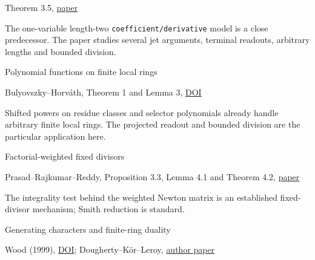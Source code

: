 \documentclass[11pt,a4paper]{article}
\newlength{\OfflineResearchTableWidth}
\newcommand{\OfflineResearchRow}{\par}
\newenvironment{OfflineResearchTable}{%
  \par\medskip\begingroup\small\setlength{\parindent}{0pt}%
  \setlength{\parskip}{3pt plus 1pt minus .5pt}%
  \setlength{\OfflineResearchTableWidth}{\linewidth}%
}{%
  \par\endgroup\medskip%
}
\begin{document}
\begin{OfflineResearchTable}
\begin{minipage}[t]{0.34020\OfflineResearchTableWidth}
Theorem 3.5, \href{https://arxiv.org/abs/1910.00238}{paper}
\end{minipage}\hfill%
\begin{minipage}[t]{0.36855\OfflineResearchTableWidth}\raggedright
The
one-variable length-two \nolinkurl{coefficient/derivative} model is a
close predecessor. The paper studies several jet arguments, terminal
readouts, arbitrary lengths and bounded division.
\end{minipage}%
\OfflineResearchRow
\noindent%
\begin{minipage}[t]{0.23625\OfflineResearchTableWidth}\raggedright
Polynomial functions on finite local rings
\end{minipage}\hfill%
\begin{minipage}[t]{0.34020\OfflineResearchTableWidth}\raggedright
Bulyovszky--Horváth,
Theorem 1 and Lemma 3,
\href{https://doi.org/10.1016/j.tcs.2017.09.002}{DOI}
\end{minipage}\hfill%
\begin{minipage}[t]{0.36855\OfflineResearchTableWidth}\raggedright
Shifted powers
on residue classes and selector polynomials already handle arbitrary
finite local rings. The projected readout and bounded division are the
particular application here.
\end{minipage}%
\OfflineResearchRow
\noindent%
\begin{minipage}[t]{0.23625\OfflineResearchTableWidth}\raggedright
Factorial-weighted fixed divisors
\end{minipage}\hfill%
\begin{minipage}[t]{0.34020\OfflineResearchTableWidth}\raggedright
Prasad--Rajkumar--Reddy, Proposition
3.3, Lemma 4.1 and Theorem 4.2,
\href{https://arxiv.org/abs/1803.05780}{paper}
\end{minipage}\hfill%
\begin{minipage}[t]{0.36855\OfflineResearchTableWidth}\raggedright
The integrality test
behind the weighted Newton matrix is an established fixed-divisor
mechanism; Smith reduction is standard.
\end{minipage}%
\OfflineResearchRow
\noindent%
\begin{minipage}[t]{0.23625\OfflineResearchTableWidth}\raggedright
Generating characters and finite-ring duality
\end{minipage}\hfill%
\begin{minipage}[t]{0.34020\OfflineResearchTableWidth}\raggedright
Wood (1999),
\href{https://doi.org/10.1353/ajm.1999.0024}{DOI};
Dougherty--Kör--Leroy,
\href{https://leroy.perso.math.cnrs.fr/Articles/chi10.pdf}{author paper}

\end{minipage}
\end{OfflineResearchTable}
\end{document}
